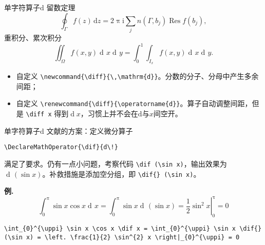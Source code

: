 \documentclass[mathserif]{beamer}
\newcommand{\codegreen}[1]{\textcolor{codegreen}{#1}}
\DeclareMathOperator{\dif}{d\!}
\newcommand{\mi}{\mathrm{i}}
\newcommand{\md}{\mathrm{d}}
\newenvironment{instance}{\zihao{-5}\textbf{\songti \codegreen{例.}}}{\hfill\par}
\begin{document}
\begin{frame}[fragile]{单字符算子}{$\mathrm{d}$}
留数定理
\begin{equation*}
	\oint_{\varGamma} f \left( z \right) \,\mathrm{d} z = 2 \uppi \mi \sum_{j} n \left( \varGamma, b_{j} \right) \operatorname{Res} f \left( b_{j} \right),
\end{equation*}
重积分、累次积分
\begin{equation*}
	\iint_{\varOmega} f \left( x, y \right) \dif x \dif y = \int_{0}^{1} \int_{I_{x}} f \left( x, y \right) \dif x \dif y.
\end{equation*}
\begin{itemize}

\item 自定义 \lstinline'\newcommand{\diff}{\,\mathrm{d}}'。分数的分子、分母中产生多余间距；

\item 自定义 \lstinline'\renewcommand{\diff}{\operatorname{d}}'。算子自动调整间距，但是 \lstinline'\diff x' 得到$\operatorname{d} x$，习惯上并不会在$\md$与$x$间空开。

\end{itemize}
\end{frame}

\begin{frame}[fragile]{单字符算子}{$\mathrm{d}$}
文献\cite{LaTeX入门}的方案：定义微分算子
\begin{lstlisting}[numbers=none]
\DeclareMathOperator{\dif}{d\!}
\end{lstlisting}
满足了要求。仍有一点小问题，考察代码 \lstinline'\dif (\sin x)'，输出效果为$\dif (\sin x)$。补救措施是添加空分组，即 \lstinline'\dif{} (\sin x)'。

\begin{instance}
\begin{equation*}
	\int_{0}^{\uppi} \sin x \cos x \dif x = \int_{0}^{\uppi} \sin x \dif{} (\sin x) = \left. \frac{1}{2} \sin^{2} x \right|_{0}^{\uppi} = 0
\end{equation*}
\begin{lstlisting}[numbers=none]
\int_{0}^{\uppi} \sin x \cos x \dif x = \int_{0}^{\uppi} \sin x \dif{} (\sin x) = \left. \frac{1}{2} \sin^{2} x \right|_{0}^{\uppi} = 0
\end{lstlisting}
\end{instance}
\end{frame}
\end{document}
